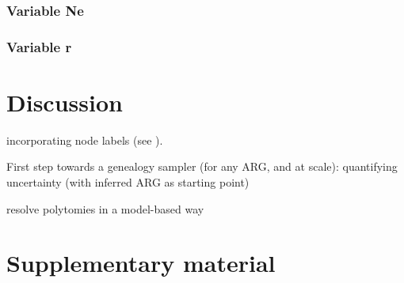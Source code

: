 \documentclass{article}
\begin{document}
\subsubsection{Variable Ne}

\subsubsection{Variable r}


\section{Discussion}


incorporating node labels (see \citep{guo_recombination-aware_2022}).

First step towards a genealogy sampler (for any ARG, and at scale): quantifying uncertainty 
(with inferred ARG as starting point)

resolve polytomies in a model-based way






\section{Supplementary material}
\end{document}
